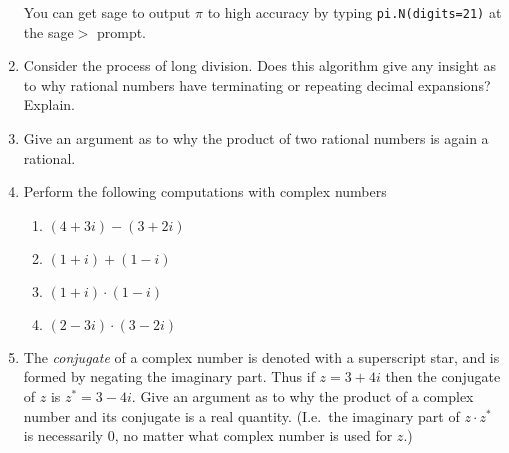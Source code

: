 \begin{enumerate}
{You can get sage to output $\pi$ to high accuracy by typing {\tt pi.N(digits=21)}
at the sage$>$ prompt.}

\vfill

\workbookpagebreak
 
\item Consider the process of long division.  Does this algorithm give
any insight as to why rational numbers have terminating or repeating
decimal expansions?  Explain.


\vfill

\item Give an argument as to why the product of two rational numbers
is again a rational.


\vfill

\textbookpagebreak

\hintspagebreak

\item Perform the following computations with complex numbers

  \begin{enumerate}
  \item \rule{0pt}{20pt}$ (4 + 3i) - (3 + 2i) $
  \item \rule{0pt}{20pt}$ (1 + i) + (1 - i) $
  \item \rule{0pt}{20pt}$ (1 + i) \cdot (1 - i) $
  \item \rule{0pt}{20pt}$ (2 - 3i) \cdot (3 - 2i) $
  \end{enumerate}


\workbookpagebreak

\item The {\em conjugate} of a complex number is denoted with a
  superscript star, and is formed by negating the imaginary part.
  Thus if $z = 3+ 4i$ then the conjugate of $z$ is  $z^\ast = 3-4i$.
  Give an argument as to why the product of a complex number and its
  conjugate is a real quantity.  (I.e.\ the imaginary part of
  $z\cdot z^\ast$ is necessarily 0, no matter what complex number is
  used for $z$.) 


\end{enumerate}
